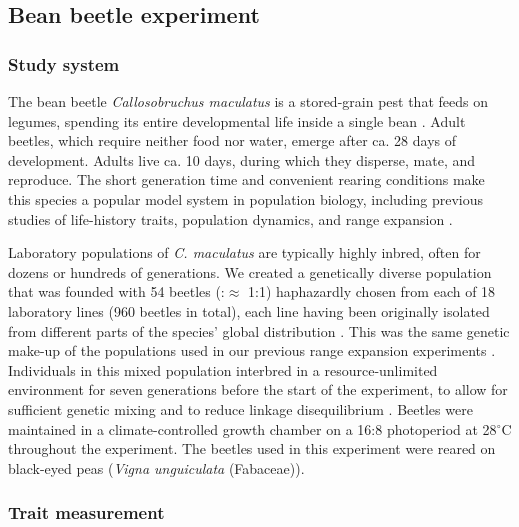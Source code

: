 \documentclass[11pt]{article}
\begin{document}
\subsection*{Bean beetle experiment}

\subsubsection*{Study system}

The bean beetle \textit{Callosobruchus maculatus} is a stored-grain pest that feeds on legumes, spending its entire developmental life inside a single bean \citep{fujii_behavioral_1990}.
Adult beetles, which require neither food nor water, emerge after ca. 28 days of development.
Adults live ca. 10 days, during which they disperse, mate, and reproduce.
The short generation time and convenient rearing conditions make this species a popular model system in population biology, including previous studies of life-history traits, population dynamics, and range expansion \citep{bellows_analytical_1982,fujii_behavioral_1990,miller_confronting_2011,miller_sex_2013,wagner_genetic_2016,ochocki_rapid_2017}.

Laboratory populations of \textit{C. maculatus} are typically highly inbred, often for dozens or hundreds of generations.
We created a genetically diverse population that was founded with 54 beetles (\female:\mars $\approx$ 1:1) haphazardly chosen from each of 18 laboratory lines (960 beetles in total), each line having been originally isolated from different parts of the species’ global distribution \citep{downey_comparative_2015}.
This was the same genetic make-up of the populations used in our previous range expansion experiments \citep{ochocki_rapid_2017}.
Individuals in this mixed population interbred in a resource-unlimited environment for seven generations before the start of the experiment, to allow for sufficient genetic mixing and to reduce linkage disequilibrium \citep{roughgarden_theory_1979,ochocki_rapid_2017}.
Beetles were maintained in a climate-controlled growth chamber on a 16:8 photoperiod at 28$^{\circ}$C throughout the experiment.
The beetles used in this experiment were reared on black-eyed peas (\textit{Vigna unguiculata} (Fabaceae)). %

\subsubsection*{Trait measurement}
\end{document}
